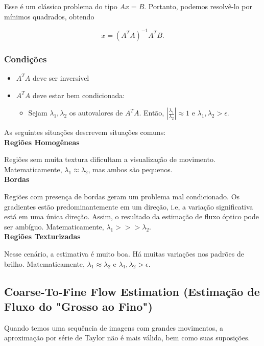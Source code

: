 \documentclass[12pt, a4paper]{article}
\begin{document}
Esse é um clássico problema do tipo $Ax=B$. Portanto, podemos resolvê-lo por mínimos quadrados, obtendo

\[
x = (A^T A)^{-1}A^TB.
\]

\subsubsection{Condições}

\begin{itemize}
    \item $A^TA$ deve ser inversível
    \item $A^TA$ deve estar bem condicionada:
    \begin{itemize}
        \item Sejam $\lambda_1, \lambda_2$ os autovalores de $A^TA$. Então, $|\frac{\lambda_1}{\lambda_2}| \approx 1$ e $\lambda_1, \lambda_2 > \epsilon$.
    \end{itemize}
\end{itemize}

As seguintes situações descrevem situações comuns: \\

\textbf{Regiões Homogêneas}

Regiões sem muita textura dificultam a visualização de movimento. Matematicamente, $\lambda_1 \approx \lambda_2$, mas ambos são pequenos. \\

\textbf{Bordas}

Regiões com presença de bordas geram um problema mal condicionado. Os gradientes estão predominantemente em um direção, i.e, a variação significativa está em uma única direção. Assim, o resultado da estimação de fluxo óptico pode ser ambíguo. Matematicamente, $\lambda_1 >>> \lambda_2$. \\

\textbf{Regiões Texturizadas}

Nesse cenário, a estimativa é muito boa. Há muitas variações nos padrões de brilho. Matematicamente, $\lambda_1 \approx \lambda_2$ e $\lambda_1, \lambda_2 > \epsilon$.

\subsection{Coarse-To-Fine Flow Estimation (Estimação de Fluxo do "Grosso ao Fino") }

Quando temos uma sequência de imagens com grandes movimentos, a aproximação por série de Taylor não é mais válida, bem como suas suposições.
\end{document}
